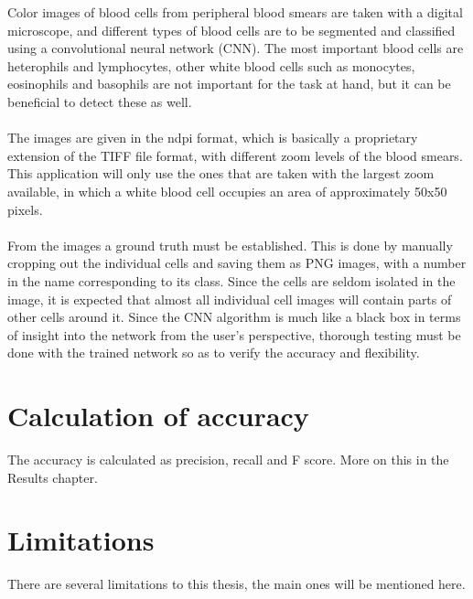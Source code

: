 \begin{center}
\end{center}
Color images of blood cells from peripheral blood smears are taken with a digital microscope, and different types of blood cells are to be segmented and classified using a convolutional neural network (CNN). The most important blood cells are heterophils and lymphocytes, other white blood cells such as monocytes, eosinophils and basophils are not important for the task at hand, but it can be beneficial to detect these as well.\\\\
The images are given in the ndpi format, which is basically a proprietary extension of the TIFF file format, with different zoom levels of the blood smears. This application will only use the ones that are taken with the largest zoom available, in which a white blood cell occupies an area of approximately 50x50 pixels.\\\\
From the images a ground truth must be established. This is done by manually cropping out the individual cells and saving them as PNG images, with a number in the name corresponding to its class. Since the cells are seldom isolated in the image, it is expected that almost all individual cell images will contain parts of other cells around it. 
Since the CNN algorithm is much like a black box in terms of insight into the network from the user's perspective, thorough testing must be done with the trained network so as to verify the accuracy and flexibility.

\section{Calculation of accuracy}
The accuracy is calculated as precision, recall and F score. More on this in the Results chapter.

\section{Limitations}
There are several limitations to this thesis, the main ones will be mentioned here.

